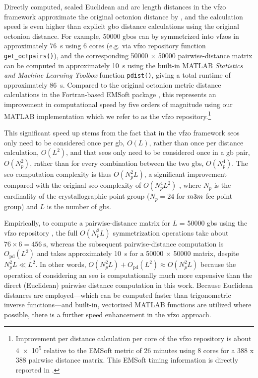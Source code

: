 \documentclass[final,twocolumn,12pt]{elsarticle}
\newcommand{\vfzorepo}{\gls{vfzo} repository}
\newcommand{\symtime}{76}
\begin{document}
Directly computed, scaled Euclidean and arc length distances in the \gls{vfzo} framework approximate the original octonion distance by \citet{francisGeodesicOctonionMetric2019}, and the calculation speed is even higher than explicit \gls{gbo} distance calculations using the original octonion distance. For example, \num{50000} \glspl{gbo} can by symmetrized into \glspl{vfzo} in approximately \SI{\symtime}{\second} using 6 cores (e.g. via \vfzorepo{} function \texttt{get\_octpairs()}), and the corresponding \num{50000} $\times$ \num{50000} pairwise-distance matrix can be computed in approximately \SI{10}{\second} using the built-in MATLAB \textit{Statistics and Machine Learning Toolbox} function \texttt{pdist()}, giving a total runtime of approximately \SI{86}{\second}. Compared to the original octonion metric distance calculations \cite{chesserLearningGrainBoundary2020} in the Fortran-based EMSoft package \cite{degraefEMSoft2020}, this represents an improvement in computational speed by five orders of magnitude using our MATLAB implementation \cite{bairdFiveDegreeofFreedom5DOF2020} which we refer to as the \vfzorepo{}.\footnote{Improvement per distance calculation per core of the \vfzorepo{} is about \num{4e5} relative to the EMSoft \cite{degraefEMSoft2020} metric of 26 minutes using 8 cores for a 388 x 388 pairwise distance matrix. This EMSoft timing information is directly reported in \cite{chesserLearningGrainBoundary2020}.} %

This significant speed up stems from the fact that in the \gls{vfzo} framework \glspl{seo} only need to be considered once per \gls{gb}, $O(L)$, rather than once per distance calculation, $O(L^2)$,
and that \glspl{seo} only need to be considered once in a \gls{gb} pair, $O(N_p^2)$, rather than for every combination between the two \glspl{gb}, $O(N_p^4)$. The \gls{seo} computation complexity is thus $O(N_p^2L)$, a significant improvement compared with the original \gls{seo} complexity of $O(N_p^4L^2)$ \cite{chesserLearningGrainBoundary2020}, where $N_p$ is the cardinality of the crystallographic point group ($N_p=24$ for $m\Bar{3}m$ \gls{fcc} point group) and $L$ is the number of \glspl{gb}. 

Empirically, to compute a pairwise-distance matrix for $L$ = \num{50000} \glspl{gb} using the \vfzorepo{} \cite{bairdFiveDegreeofFreedom5DOF2020}, the full $O(N_p^2L)$ symmetrization operations take about $\symtime{}\times 6 = \SI{456}{\second}$, whereas the subsequent pairwise-distance computation is $O_{\text{pd}}(L^2)$ and takes approximately \SI{10}{\second} for a \num{50000} $\times$ \num{50000} matrix, despite $N_p^2L \ll L^2$. In other words, $O(N_p^2L)+O_\text{pd}(L^2)\approx O(N_p^2L)$  because the operation of considering an \gls{seo} is computationally much more expensive than the direct (Euclidean) pairwise distance computation in this work. Because Euclidean distances are employed---which can be computed faster than trigonometric inverse functions---and built-in, vectorized MATLAB functions are utilized where possible, there is a further speed enhancement in the \gls{vfzo} approach. %
\end{document}
